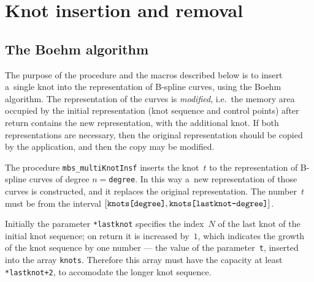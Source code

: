 

\newpage
\section{Knot insertion and removal}

\subsection{\label{ssect:knot:ins}The Boehm algorithm}

The purpose of the procedure and the macros described below is
to insert a~single knot into the representation of B-spline curves,
using the Boehm algorithm. The representation of the curves is
\emph{modified}, i.e.\ the memory area occupied by the initial representation
(knot sequence and control points) after return contains the new
representation, with the additional knot. If both representations are
necessary, then the original representation should be copied by the
application, and then the copy may be modified.

\vspace{\bigskipamount}
The procedure \texttt{mbs\_multiKnotInsf} inserts the knot~$t$ to
the representation of B-spline curves of degree $n=$\texttt{degree}.
In this way a~new representation of those curves is constructed, and it replaces
the original representation. The number~$t$ must be from the interval
$[\mbox{\texttt{knots[degree]}},\mbox{\texttt{knots[lastknot-degree]}}]$.

Initially the parameter \texttt{*lastknot} specifies the index~$N$ of the
last knot of the initial knot sequence; on return it is increased by~$1$,
which indicates the growth of the knot sequence by one number --- the
value of the parameter~\texttt{t}, inserted into the array
\texttt{knots}. Therefore this array must have the capacity at least
\texttt{*lastknot+2}, to accomodate the longer knot sequence.

